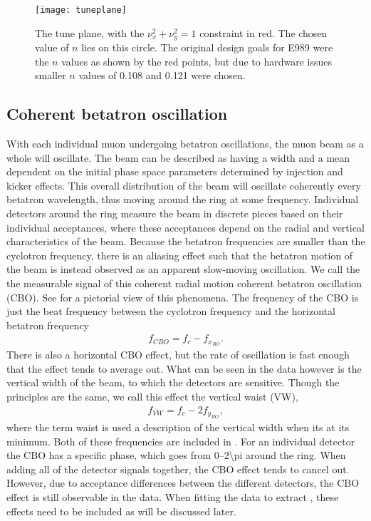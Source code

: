 \begin{figure}[]
    \centering
    \texttt{[image: tuneplane]}
    \caption[Tune plane]{The tune plane, with the $\nu_{x}^{2} + \nu_{y}^{2} = 1$ constraint in red. The chosen value of $n$ lies on this circle. The original design goals for E989 were the $n$ values as shown by the red points, but due to hardware issues smaller $n$ values of 0.108 and 0.121 were chosen.}
    \label{fig:tuneplane}
\end{figure}



\subsection{Coherent betatron oscillation}


With each individual muon undergoing betatron oscillations, the muon beam as a whole will oscillate. The beam can be described as having a width and a mean dependent on the initial phase space parameters determined by injection and kicker effects. This overall distribution of the beam will oscillate coherently every betatron wavelength, thus moving around the ring at some frequency. Individual detectors around the ring measure the beam in discrete pieces based on their individual acceptances, where these acceptances depend on the radial and vertical characteristics of the beam. Because the betatron frequencies are smaller than the cyclotron frequency, there is an aliasing effect such that the betatron motion of the beam is instead observed as an apparent slow-moving oscillation. We call the the measurable signal of this coherent radial motion coherent betatron oscillation (CBO). See  for a pictorial view of this phenomena. The frequency of the CBO is just the beat frequency between the cyclotron frequency and the horizontal betatron frequency
        \begin{align}
            f_{CBO} = f_{c}-f_{x_{BO}}.
        \end{align}
There is also a horizontal CBO effect, but the rate of oscillation is fast enough that the effect tends to average out. What can be seen in the data however is the vertical width of the beam, to which the detectors are sensitive. Though the principles are the same, we call this effect the vertical waist (VW),
        \begin{align}
            f_{VW} = f_{c}-2f_{y_{BO}},
        \end{align}
where the term waist is used a description of the vertical width when its at its minimum. Both of these frequencies are included in . For an individual detector the CBO has a specific phase, which goes from \SIrange{0}{2\pi}{} around the ring. When adding all of the detector signals together, the CBO effect tends to cancel out. However, due to acceptance differences between the different detectors, the CBO effect is still observable in the data. When fitting the data to extract \wa, these effects need to be included as will be discussed later.


